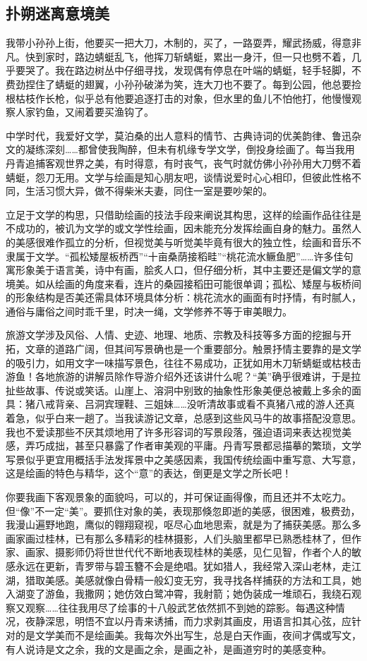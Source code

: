 \documentclass{article}
\begin{document}
\subsection{扑朔迷离意境美}
我带小孙孙上街，他要买一把大刀，木制的，买了，一路耍弄，耀武扬威，得意非凡。快到家时，路边蜻蜓乱飞，他挥刀斩蜻蜓，累出一身汗，但一只也劈不着，几乎要哭了。我在路边树丛中仔细寻找，发现偶有停息在叶端的蜻蜓，轻手轻脚，不费劲捏住了蜻蜓的翅翼，小孙孙破涕为笑，连大刀也不要了。每到公园，他总要捡根枯枝作长枪，似乎总有他要追逐打击的对象，但水里的鱼儿不怕他打，他慢慢观察人家钓鱼，又闹着要买渔钩了。

中学时代，我爱好文学，莫泊桑的出人意料的情节、古典诗词的优美韵律、鲁迅杂文的凝练深刻……都曾使我陶醉，但未有机缘专学文学，倒投身绘画了。每当我用丹青追捕客观世界之美，有时得意，有时丧气，丧气时就仿佛小孙孙用大刀劈不着蜻蜓，怨刀无用。文学与绘画是知心朋友吧，谈情说爱时心心相印，但彼此性格不同，生活习惯大异，做不得柴米夫妻，同住一室是要吵架的。

立足于文学的构思，只借助绘画的技法手段来阐说其构思，这样的绘画作品往往是不成功的，被讥为文学的或文学性绘画，因未能充分发挥绘画自身的魅力。虽然人的美感很难作孤立的分析，但视觉美与听觉美毕竟有很大的独立性，绘画和音乐不隶属于文学。“孤松矮屋板桥西”“十亩桑荫接稻畦”“桃花流水鳜鱼肥”……许多佳句寓形象美于语言美，诗中有画，脍炙人口，但仔细分析，其中主要还是偏文学的意境美。如从绘画的角度来看，连片的桑园接稻田可能很单调；孤松、矮屋与板桥间的形象结构是否美还需具体环境具体分析：桃花流水的画面有时抒情，有时腻人，通俗与庸俗之间时乖千里，时决一绳，文学修养不等于审美眼力。

旅游文学涉及风俗、人情、史迹、地理、地质、宗教及科技等多方面的挖掘与开拓，文章的道路广阔，但其间写景确也是一个重要部分。触景抒情主要靠的是文学的吸引力，如用文字一味描写景色，往往不易成功，正犹如用木刀斩蜻蜓或枯枝击游鱼！各地旅游的讲解员除作导游介绍外还该讲什么呢？“美”确乎很难讲，于是拉扯些故事、传说或笑话。山崖上、溶洞中别致的抽象性形象美便总被戴上多余的面具：猪八戒背亲、吕洞宾理鞋、三姐妹……没听清故事或看不真猪八戒的游人还真着急，似乎白来一趟了。当我读游记文章，总感到这些风马牛的故事搭配没意思。我也不爱读那些不厌其烦地用了许多形容词的写景段落，强迫语词来表达视觉美感，弄巧成拙，甚至只暴露了作者审美观的平庸。丹青写景都忌描摹的繁琐，文学写景似乎更宜用概括手法发挥景中之美感因素，我国传统绘画中重写意、大写意，这是绘画的特色与精华，这个“意”的表达，倒更是文学之所长吧！

你要我画下客观景象的面貌吗，可以的，并可保证画得像，而且还并不太吃力。但“像”不一定“美”。要抓住对象的美，表现那倏忽即逝的美感，很困难，极费劲，我漫山遍野地跑，鹰似的翱翔窥视，呕尽心血地思索，就是为了捕获美感。那么多画家画过桂林，已有那么多精彩的桂林摄影，人们头脑里都早已熟悉桂林了，但作家、画家、摄影师仍将世世代代不断地表现桂林的美感，见仁见智，作者个人的敏感永远在更新，青罗带与碧玉簪不会是绝唱。犹如猎人，我经常入深山老林，走江湖，猎取美感。美感就像白骨精一般幻变无穷，我寻找各样捕获的方法和工具，她入湖变了游鱼，我撒网；她仿效白鹭冲霄，我射箭；她伪装成一堆顽石，我绕石观察又观察……往往我用尽了绘事的十八般武艺依然抓不到她的踪影。每遇这种情况，夜静深思，明悟不宜以丹青来诱捕，而力求剥其画皮，用语言扣其心弦，应针对的是文学美而不是绘画美。我每次外出写生，总是白天作画，夜间才偶或写文，有人说诗是文之余，我的文是画之余，是画之补，是画道穷时的美感变种。
\end{document}
